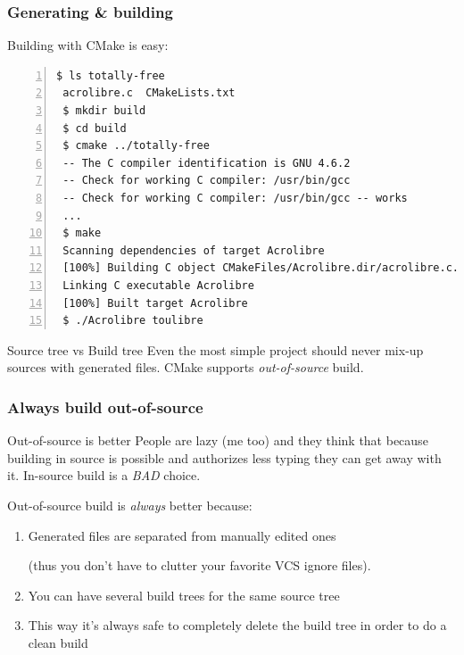 \documentclass[compress,slidestop,table
              ]
               {beamer}
\begin{document}
\begin{frame}[fragile]
\frametitle{Generating \& building}
Building with CMake is easy:
\begin{center}
\begin{Verbatim}[fontsize=\tiny,numbers=left,frame=topline,label=CMake + Unix Makefile]
 $ ls totally-free
 acrolibre.c  CMakeLists.txt
 $ mkdir build
 $ cd build
 $ cmake ../totally-free
 -- The C compiler identification is GNU 4.6.2
 -- Check for working C compiler: /usr/bin/gcc
 -- Check for working C compiler: /usr/bin/gcc -- works
 ...
 $ make
 Scanning dependencies of target Acrolibre
 [100%] Building C object CMakeFiles/Acrolibre.dir/acrolibre.c.o
 Linking C executable Acrolibre
 [100%] Built target Acrolibre
 $ ./Acrolibre toulibre
\end{Verbatim}

\end{center}
\begin{alertblock}{Source tree vs Build tree}
Even the most simple project should never mix-up sources
with generated files. CMake supports \emph{out-of-source} build.
\end{alertblock}
\end{frame}

\begin{frame}[fragile]
\frametitle{Always build out-of-source}
\begin{alertblock}{Out-of-source is better}
People are lazy (me too) and they think that because
building in source is possible and authorizes less typing
they can get away with it.
In-source build is a \emph{BAD} choice.
\end{alertblock}
Out-of-source build is \emph{always} better because:
\begin{enumerate}
\pause
\item Generated files are separated from manually edited ones

      (thus you don't have to clutter your favorite VCS ignore files).
\pause
\item You can have several build trees for the same source tree
\pause
\item This way it's always safe to completely delete the build tree
      in order to do a clean build
\end{enumerate}
\end{frame}
\end{document}
